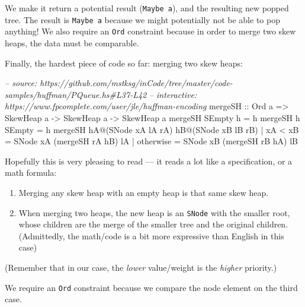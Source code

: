 \documentclass[]{article}
\newenvironment{Shaded}{}{}
\newcommand{\DataTypeTok}[1]{\textcolor[rgb]{0.56,0.13,0.00}{#1}}
\newcommand{\CommentTok}[1]{\textcolor[rgb]{0.38,0.63,0.69}{\textit{#1}}}
\newcommand{\OtherTok}[1]{\textcolor[rgb]{0.00,0.44,0.13}{#1}}
\newcommand{\FunctionTok}[1]{\textcolor[rgb]{0.02,0.16,0.49}{#1}}
\newcommand{\NormalTok}[1]{#1}
\begin{document}
We make it return a potential result (\texttt{Maybe\ a}), and the resulting new
popped tree. The result is \texttt{Maybe\ a} because we might potentially not be
able to pop anything! We also require an \texttt{Ord} constraint because in
order to merge two skew heaps, the data must be comparable.

Finally, the hardest piece of code so far: merging two skew heaps:

\begin{Shaded}
\begin{Highlighting}[]
\CommentTok{-- source: https://github.com/mstksg/inCode/tree/master/code-samples/huffman/PQueue.hs#L37-L42}
\CommentTok{-- interactive: https://www.fpcomplete.com/user/jle/huffman-encoding}
\OtherTok{mergeSH ::} \DataTypeTok{Ord}\NormalTok{ a }\OtherTok{=>} \DataTypeTok{SkewHeap}\NormalTok{ a }\OtherTok{->} \DataTypeTok{SkewHeap}\NormalTok{ a }\OtherTok{->} \DataTypeTok{SkewHeap}\NormalTok{ a}
\NormalTok{mergeSH }\DataTypeTok{SEmpty}\NormalTok{ h }\FunctionTok{=}\NormalTok{ h}
\NormalTok{mergeSH h }\DataTypeTok{SEmpty} \FunctionTok{=}\NormalTok{ h}
\NormalTok{mergeSH hA}\FunctionTok{@}\NormalTok{(}\DataTypeTok{SNode}\NormalTok{ xA lA rA) hB}\FunctionTok{@}\NormalTok{(}\DataTypeTok{SNode}\NormalTok{ xB lB rB)}
    \FunctionTok{|}\NormalTok{ xA }\FunctionTok{<}\NormalTok{ xB    }\FunctionTok{=} \DataTypeTok{SNode}\NormalTok{ xA (mergeSH rA hB) lA}
    \FunctionTok{|}\NormalTok{ otherwise  }\FunctionTok{=} \DataTypeTok{SNode}\NormalTok{ xB (mergeSH rB hA) lB}
\end{Highlighting}
\end{Shaded}

Hopefully this is very pleasing to read --- it reads a lot like a specification,
or a math formula:

\begin{enumerate}
\def\labelenumi{\arabic{enumi}.}
\tightlist
\item
  Merging any skew heap with an empty heap is that same skew heap.
\item
  When merging two heaps, the new heap is an \texttt{SNode} with the smaller
  root, whose children are the merge of the smaller tree and the original
  children. (Admittedly, the math/code is a bit more expressive than English in
  this case)
\end{enumerate}

(Remember that in our case, the \emph{lower} value/weight is the \emph{higher}
priority.)

We require an \texttt{Ord} constraint because we compare the node element on the
third case.
\end{document}
